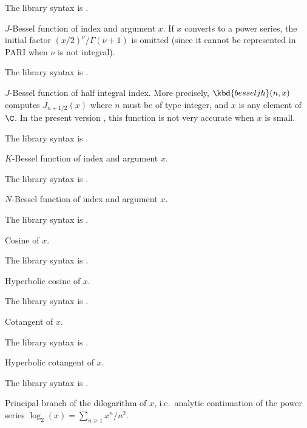 The library syntax is .

\label{se:besselj}
$J$-Bessel function of index  and
argument $x$. If $x$ converts to a power series, the initial factor
$(x/2)^\nu/\Gamma(\nu+1)$ is omitted (since it cannot be represented in PARI
when $\nu$ is not integral).

The library syntax is .

\label{se:besseljh}
$J$-Bessel function of half integral index.
More precisely, $\kbd{besseljh}(n,x)$ computes $J_{n+1/2}(x)$ where $n$
must be of type integer, and $x$ is any element of $\C$. In the
present version \vers, this function is not very accurate when $x$ is small.

The library syntax is .

\label{se:besselk}
$K$-Bessel function of index  and argument $x$.

The library syntax is .

\label{se:besseln}
$N$-Bessel function of index  and argument $x$.

The library syntax is .

\label{se:cos}
Cosine of $x$.

The library syntax is .

\label{se:cosh}
Hyperbolic cosine of $x$.

The library syntax is .

\label{se:cotan}
Cotangent of $x$.

The library syntax is .

\label{se:cotanh}
Hyperbolic cotangent of $x$.

The library syntax is .

\label{se:dilog}
Principal branch of the dilogarithm of $x$,
i.e.~analytic continuation of the power series $\log_2(x)=\sum_{n\ge1}x^n/n^2$.

